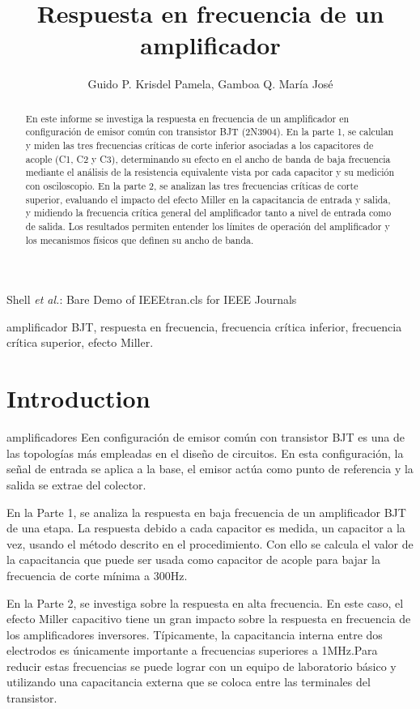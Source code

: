 \documentclass[journal]{IEEEtran}
\begin{document}
\title{Respuesta en frecuencia de un amplificador}
\author{Guido P. Krisdel Pamela, Gamboa Q. María José} 
{Shell \MakeLowercase{\textit{et al.}}: Bare Demo of IEEEtran.cls for IEEE Journals}

\maketitle
\renewcommand{\abstractname}{Resumen}
\begin{abstract}
En este informe se investiga la respuesta en frecuencia de un amplificador en configuración de emisor común con transistor BJT (2N3904). En la parte 1, se calculan y miden las tres frecuencias críticas de corte inferior asociadas a los capacitores de acople (C1, C2 y C3), determinando su efecto en el ancho de banda de baja frecuencia mediante el análisis de la resistencia equivalente vista por cada capacitor y su medición con osciloscopio. En la parte 2, se analizan las tres frecuencias críticas de corte superior, evaluando el impacto del efecto Miller en la capacitancia de entrada y salida, y midiendo la frecuencia crítica general del amplificador tanto a nivel de entrada como de salida. Los resultados permiten entender los límites de operación del amplificador y los mecanismos físicos que definen su ancho de banda. 
\end{abstract}

\renewcommand{\IEEEkeywordsname}{Palabras clave}
\begin{IEEEkeywords}
amplificador BJT, respuesta en frecuencia, frecuencia crítica inferior, frecuencia crítica superior, efecto Miller.
\end{IEEEkeywords}

\IEEEpeerreviewmaketitle

\section{Introduction}
amplificadores Een configuración de emisor común con transistor BJT es una de las topologías más empleadas en el diseño de circuitos. En esta configuración, la señal de entrada se aplica a la base, el emisor actúa como punto de referencia y la salida se extrae del colector. 
\par En la Parte 1, se analiza la respuesta en baja frecuencia de un amplificador BJT de una etapa. La respuesta debido a cada capacitor es medida, un capacitor a la vez, usando el método descrito en el procedimiento. Con ello se calcula el valor de la capacitancia que puede ser usada como capacitor de acople para bajar la frecuencia de corte mínima a 300Hz.
\par En la Parte 2, se investiga sobre la respuesta en alta frecuencia. En este caso, el efecto Miller capacitivo tiene un gran impacto sobre la respuesta en frecuencia de los amplificadores inversores. Típicamente, la capacitancia interna entre dos electrodos es únicamente importante a frecuencias superiores a 1MHz.Para reducir estas frecuencias se puede lograr con un equipo de laboratorio básico y utilizando una capacitancia externa que se coloca entre las terminales del transistor.
\end{document}
